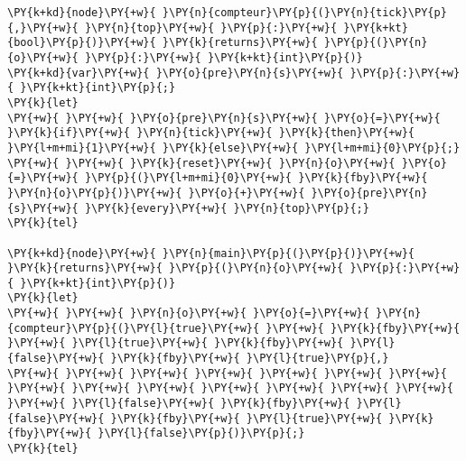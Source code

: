 \begin{Verbatim}[commandchars=\\\{\}]
\PY{k+kd}{node}\PY{+w}{ }\PY{n}{compteur}\PY{p}{(}\PY{n}{tick}\PY{p}{,}\PY{+w}{ }\PY{n}{top}\PY{+w}{ }\PY{p}{:}\PY{+w}{ }\PY{k+kt}{bool}\PY{p}{)}\PY{+w}{ }\PY{k}{returns}\PY{+w}{ }\PY{p}{(}\PY{n}{o}\PY{+w}{ }\PY{p}{:}\PY{+w}{ }\PY{k+kt}{int}\PY{p}{)}
\PY{k+kd}{var}\PY{+w}{ }\PY{o}{pre}\PY{n}{s}\PY{+w}{ }\PY{p}{:}\PY{+w}{ }\PY{k+kt}{int}\PY{p}{;}
\PY{k}{let}
\PY{+w}{ }\PY{+w}{ }\PY{o}{pre}\PY{n}{s}\PY{+w}{ }\PY{o}{=}\PY{+w}{ }\PY{k}{if}\PY{+w}{ }\PY{n}{tick}\PY{+w}{ }\PY{k}{then}\PY{+w}{ }\PY{l+m+mi}{1}\PY{+w}{ }\PY{k}{else}\PY{+w}{ }\PY{l+m+mi}{0}\PY{p}{;}
\PY{+w}{ }\PY{+w}{ }\PY{k}{reset}\PY{+w}{ }\PY{n}{o}\PY{+w}{ }\PY{o}{=}\PY{+w}{ }\PY{p}{(}\PY{l+m+mi}{0}\PY{+w}{ }\PY{k}{fby}\PY{+w}{ }\PY{n}{o}\PY{p}{)}\PY{+w}{ }\PY{o}{+}\PY{+w}{ }\PY{o}{pre}\PY{n}{s}\PY{+w}{ }\PY{k}{every}\PY{+w}{ }\PY{n}{top}\PY{p}{;}
\PY{k}{tel}

\PY{k+kd}{node}\PY{+w}{ }\PY{n}{main}\PY{p}{(}\PY{p}{)}\PY{+w}{ }\PY{k}{returns}\PY{+w}{ }\PY{p}{(}\PY{n}{o}\PY{+w}{ }\PY{p}{:}\PY{+w}{ }\PY{k+kt}{int}\PY{p}{)}
\PY{k}{let}
\PY{+w}{ }\PY{+w}{ }\PY{n}{o}\PY{+w}{ }\PY{o}{=}\PY{+w}{ }\PY{n}{compteur}\PY{p}{(}\PY{l}{true}\PY{+w}{ }\PY{+w}{ }\PY{k}{fby}\PY{+w}{ }\PY{+w}{ }\PY{l}{true}\PY{+w}{ }\PY{k}{fby}\PY{+w}{ }\PY{l}{false}\PY{+w}{ }\PY{k}{fby}\PY{+w}{ }\PY{l}{true}\PY{p}{,}
\PY{+w}{ }\PY{+w}{ }\PY{+w}{ }\PY{+w}{ }\PY{+w}{ }\PY{+w}{ }\PY{+w}{ }\PY{+w}{ }\PY{+w}{ }\PY{+w}{ }\PY{+w}{ }\PY{+w}{ }\PY{+w}{ }\PY{+w}{ }\PY{+w}{ }\PY{l}{false}\PY{+w}{ }\PY{k}{fby}\PY{+w}{ }\PY{l}{false}\PY{+w}{ }\PY{k}{fby}\PY{+w}{ }\PY{l}{true}\PY{+w}{ }\PY{k}{fby}\PY{+w}{ }\PY{l}{false}\PY{p}{)}\PY{p}{;}
\PY{k}{tel}
\end{Verbatim}
